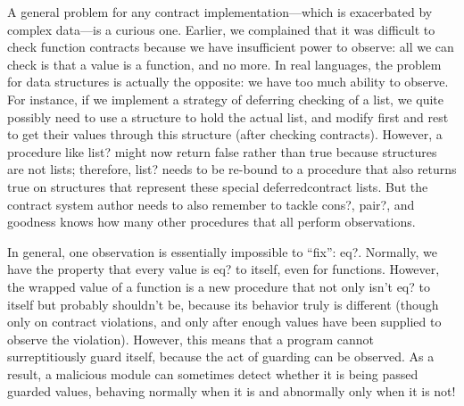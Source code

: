 
A general problem for any contract implementation—which is exacerbated by
complex data—is a curious one. Earlier, we complained that it was difficult to
check function contracts because we have insufficient power to observe: all we
can check is that a value is a function, and no more. In real languages, the
problem for data structures is actually the opposite: we have too much ability
to observe. For instance, if we implement a strategy of deferring checking of a
list, we quite possibly need to use a structure to hold the actual list, and
modify first and rest to get their values through this structure (after checking
contracts). However, a procedure like list? might now return false rather than
true because structures are not lists; therefore, list? needs to be re-bound to
a procedure that also returns true on structures that represent these special
deferredcontract lists. But the contract system author needs to also remember to
tackle cons?, pair?, and goodness knows how many other procedures that all
perform observations.

In general, one observation is essentially impossible to “fix”: eq?. Normally,
we have the property that every value is eq? to itself, even for functions.
However, the wrapped value of a function is a new procedure that not only isn’t
eq? to itself but probably shouldn’t be, because its behavior truly is different
(though only on contract violations, and only after enough values have been
supplied to observe the violation). However, this means that a program cannot
surreptitiously guard itself, because the act of guarding can be observed. As a
result, a malicious module can sometimes detect whether it is being passed
guarded values, behaving normally when it is and abnormally only when it is not!
